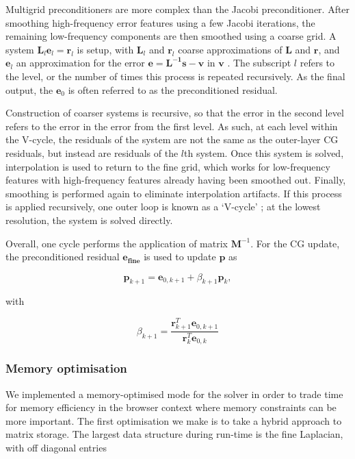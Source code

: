 \documentclass[11pt, a4paper]{article}
\begin{document}
Multigrid preconditioners are more complex than the Jacobi preconditioner. After smoothing high-frequency error features
using a few Jacobi iterations, the remaining low-frequency components are then smoothed using a coarse grid.
A system $\mathbf{L}_{l}\mathbf{e}_{l} = \mathbf{r}_{l}$ is setup, with $\mathbf{L}_{l}$ and $\mathbf{r}_{l}$ coarse 
approximations of $\mathbf{L}$ and $\mathbf{r}$, and $\mathbf{e}_{l}$ an approximation for the error $\mathbf{e} = \mathbf{L^{-1}s - v}$ in $\mathbf{v}$ \cite[Ch. 4.6]{leveque2007finite}.
The subscript $l$ refers to the level, or the number of times this process is repeated recursively.
As the final output, the $\mathbf{e}_{0}$ is often referred to as the preconditioned residual.

Construction of coarser systems is recursive, so that the error in the second level refers to the error in the error from the first level. 
As such, at each level within the V-cycle, the residuals of the system are not the same as the outer-layer CG residuals, but instead are residuals
of the $l$th system.
Once this system is solved, interpolation is used to return to the fine grid,
which works for low-frequency features with high-frequency features already having been smoothed out.
Finally, smoothing is performed again to eliminate interpolation artifacts.
If this process is applied recursively, one outer loop is known as a `V-cycle' \cite[Ch. 4.6]{leveque2007finite, alcouffe2001parallel};
at the lowest resolution, the system is solved directly. 

Overall, one cycle performs the application of matrix $\mathbf{M}^{-1}$.
For the CG update, the preconditioned residual $\mathbf{e_{fine}}$ is used to update $\mathbf{p}$ as \cite[Ch. 9.2]{saad2003iterative}

\[
\mathbf{p}_{k+1} = \mathbf{e}_{0,k+1} + \beta_{k+1}\mathbf{p}_k,
\]

with

\[
\beta_{k+1} = \frac{\mathbf{r}^T_{k+1} \mathbf{e}_{0,k+1}}{\mathbf{r}_k^T \mathbf{e}_{0,k}}
\]

\subsubsection{Memory optimisation}

We implemented a memory-optimised mode for the solver in order to trade time for memory efficiency in
the browser context where memory constraints can be more important.
The first optimisation we make is to take a hybrid approach to matrix storage. 
The largest data structure during run-time is the fine Laplacian, with off diagonal entries
\end{document}
